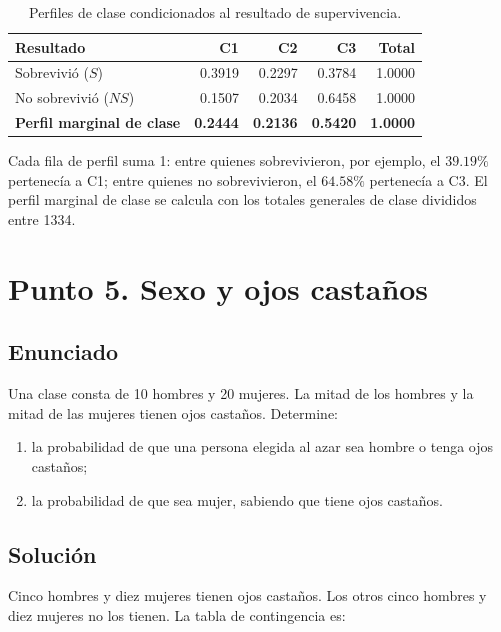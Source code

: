 \documentclass[12pt]{article}
\begin{document}
\begin{table}[H]
\centering
\small
\renewcommand{\arraystretch}{1.15}
\begin{tabular}{|l|r|r|r|r|}
\hline
\textbf{Resultado} & \textbf{C1} & \textbf{C2} & \textbf{C3} & \textbf{Total} \\ \hline
Sobrevivió ($S$) & 0.3919 & 0.2297 & 0.3784 & 1.0000 \\ \hline
No sobrevivió ($NS$) & 0.1507 & 0.2034 & 0.6458 & 1.0000 \\ \hline
\textbf{Perfil marginal de clase} & \textbf{0.2444} & \textbf{0.2136} & \textbf{0.5420} & \textbf{1.0000} \\ \hline
\end{tabular}
\caption{Perfiles de clase condicionados al resultado de supervivencia.}
\label{tab:titanic-perfiles-clase}
\end{table}

Cada fila de perfil suma 1: entre quienes sobrevivieron, por ejemplo, el $39.19\%$ pertenecía a C1; entre quienes no sobrevivieron, el $64.58\%$ pertenecía a C3. El perfil marginal de clase se calcula con los totales generales de clase divididos entre 1334.



\section*{Punto 5. Sexo y ojos castaños}

\subsection*{Enunciado}

Una clase consta de 10 hombres y 20 mujeres. La mitad de los hombres y la mitad de las mujeres tienen ojos castaños. Determine:

\begin{enumerate}
    \item la probabilidad de que una persona elegida al azar sea hombre o tenga ojos castaños;
    \item la probabilidad de que sea mujer, sabiendo que tiene ojos castaños.
\end{enumerate}

\subsection*{Solución}

Cinco hombres y diez mujeres tienen ojos castaños. Los otros cinco hombres y diez mujeres no los tienen. La tabla de contingencia es:
\end{document}
